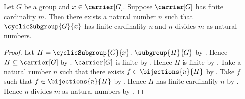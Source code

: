 \begin{corollary}\label{cyclic_subgroup_has_divisor_cardinality}
    Let $G$ be a group and $x\in\carrier[G]$.
    Suppose $\carrier[G]$ has finite cardinality $m$.
    Then there exists a natural number $n$ such that
        $\cyclicSubgroup{G}{x}$ has finite cardinality $n$ and
        $n$ divides $m$ as natural numbers.
\end{corollary}
\begin{proof}
    Let $H=\cyclicSubgroup{G}{x}$.
    $\subgroup{H}{G}$ by .
    Hence $H\subseteq\carrier[G]$ by .
    $\carrier[G]$ is finite by .
    Hence $H$ is finite by .
    Take a natural number $n$ such that there exists
        $f\in\bijections{n}{H}$ by .
    Take $f$ such that $f\in\bijections{n}{H}$ by \auto.
    Hence $H$ has finite cardinality $n$ by
        .
    Hence $n$ divides $m$ as natural numbers by
        .
\end{proof}

